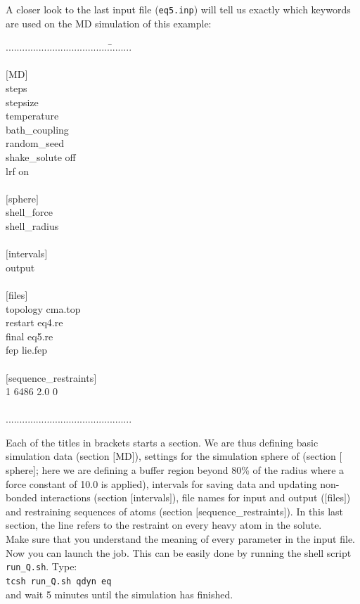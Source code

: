 \documentclass[a4paper,12pt]{article}
\newcommand{\runsh}{\texttt{run{\_}Q.sh}}
\begin{document}
A closer look to the last input file (\texttt{eq5.inp}) will tell
us exactly which keywords are used on the MD simulation of this
example:
%
%
\begin{tabbing}
......................................\=........\\
\\
$[$MD$]$ \\
steps \\
stepsize\\
temperature\\
bath\_coupling\\
random\_seed\\
shake\_solute\>              off\\
lrf\>                       on\\
\\
$[$sphere$]$ \\
shell\_force\\
shell\_radius\\
\\
$[$intervals$]$ \\
output\\
\\
$[$files$]$ \\
topology\>     cma.top\\
restart\>      eq4.re\\
final\>        eq5.re\\
fep\>          lie.fep\\
\\
$[$sequence\_restraints$]$\\
1 6486 2.0 0\\
\\
..............................................\\
\end{tabbing}

Each of the titles in brackets starts a section. We are thus defining basic simulation data (section $[$MD$]$), settings for the 
simulation sphere of (section $[$sphere$]$; here we are defining a buffer region beyond 80\% of the radius where a force constant of 10.0 is applied), intervals for saving data and updating non-bonded interactions (section $[$intervals$]$), file names for input and output ($[$files$]$) and restraining sequences of atoms (section $[$sequence\_restraints$]$). In this last section, the line refers to the restraint on every heavy atom in the solute.\\
Make sure that you understand the meaning of every parameter in the input file.
Now you can launch the job. This can be easily done by running the shell script {\runsh}. Type:\\
{\texttt {tcsh run\_Q.sh qdyn eq}}\\
and wait 5 minutes until the simulation has finished.\\
\end{document}
